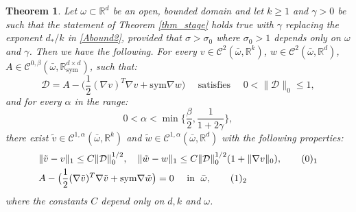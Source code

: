 \documentclass[reqno,twoside,11pt]{amsart}
\newcommand{\sym}{\mathrm{sym}}
\newcommand{\R}{\mathbb{R}}
\numberwithin{equation}{section}
\theoremstyle{plain}
\newtheorem{theorem}{Theorem}[section]
\theoremstyle{definition}
\begin{document}
\begin{theorem}\label{th_NashKuiHol}
Let $\omega\subset\R^d$ be an open, bounded domain 
and let $k\geq 1$ and $\gamma>0$ be such that the statement of Theorem \ref{thm_stage}
holds true with $\gamma$ replacing the exponent $d_*/k$ in
\ref{Abound2}, provided that $\sigma>\sigma_0$ where $\sigma_0>1$
depends only on $\omega$ and $\gamma$. Then we have the following.  
For every $v\in\mathcal{C}^2(\bar\omega,\R^k)$, $w\in\mathcal{C}^2(\bar\omega,\R^d)$,
$A\in\mathcal{C}^{0,\beta}(\bar\omega, \R^{d\times d}_\sym)$, such that:
$$\mathcal{D}=A-\big(\frac{1}{2}(\nabla v)^T\nabla v + \sym\nabla
w\big) \quad\mbox{ satisfies } \quad 0<\|\mathcal{D}\|_0\leq 1,$$
and for every $\alpha$ in the range:
\begin{equation}\label{rangeAl}
0< \alpha <\min\Big\{\frac{\beta}{2},\frac{1}{1+2\gamma}\Big\},
\end{equation}
there exist $\tilde v\in\mathcal{C}^{1,\alpha}(\bar\omega,\R^k)$ and
$\tilde w\in\mathcal{C}^{1,\alpha}(\bar\omega,\R^d)$ with the following properties:
\begin{align*}
& \|\tilde v - v\|_1\leq C\|\mathcal{D}\|_0^{1/2}, \quad \|\tilde w -
w\|_1\leq C\|\mathcal{D}\|_0^{1/2}(1+\|\nabla v\|_0),
\tag*{(\theequation)$_1$}\refstepcounter{equation} \label{Hbound1}\vspace{1mm}\\
& A-\big(\frac{1}{2}(\nabla \tilde v)^T\nabla \tilde v + \sym\nabla
\tilde w\big) =0 \quad\mbox{ in }\; \bar\omega, \tag*{(\theequation)$_2$}\label{Hbound2} 
\end{align*}
where the constants $C$ depend only on $d, k$ and $\omega$.
\end{theorem}
\end{document}
